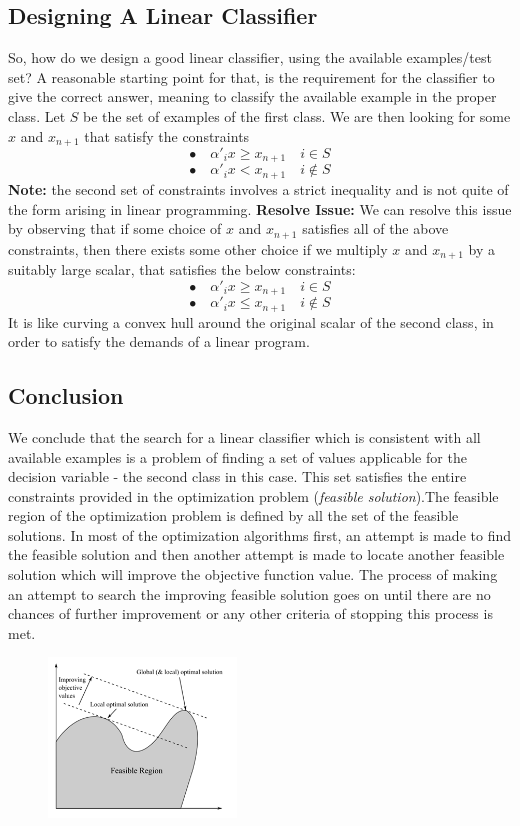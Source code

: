 \documentclass[12pt]{article}
\begin{document}
{\subsection*{Designing A Linear Classifier}
So, how do we design a good linear classifier, using the available examples/test set? 
A reasonable starting point for that, is the requirement for the classifier to give the correct answer, meaning to classify the available example in the proper class. Let $S$ be the set of examples of the first class. We are then looking for some $x$ and $x_{n+1}$ that satisfy the constraints
$$\bullet \quad \alpha'_ix \geq x_{n+1} \quad i \in S$$
$$\bullet \quad \alpha'_ix < x_{n+1} \quad i \notin S$$
\textbf{Note:} the second set of constraints involves a strict inequality and is not quite of the form arising in linear programming. 
\textbf{Resolve Issue:} We can resolve this issue by observing that if some choice of $x$ and $x_{n+1}$ satisfies all of the above constraints, then there exists some other choice if we multiply $x$ and $x_{n+1}$ by a suitably large scalar, that satisfies the below constraints:
$$\bullet \quad \alpha'_ix \geq x_{n+1} \quad i \in S$$
$$\bullet \quad \alpha'_ix \leq x_{n+1} \quad i \notin S$$
It is like curving a convex hull around the original scalar of the second class, in order to satisfy the demands of a linear program.\par
\newpage
\subsection*{Conclusion}
We conclude that the search for a linear classifier which is consistent with all available examples is a problem of finding a set of values applicable for the decision variable - the second class in this case. This set satisfies the entire constraints provided in the optimization problem (\textit{feasible solution}).The feasible region of the optimization problem is defined by all the set of the feasible solutions. In most of the optimization algorithms first, an attempt is made to find the feasible solution and then another attempt is made to locate another feasible solution which will improve the objective function value. The process of making an attempt to search the improving feasible solution goes on until there are no chances of further improvement or any other criteria of stopping this process is met.
\begin{figure}[h!]
  \begin{center}
  \includegraphics[width=50mm]{FeasibleSolution.png}
  \caption{}
  \label{figure}
  \end{center}
\end{figure}
\newpage
}
\end{document}
